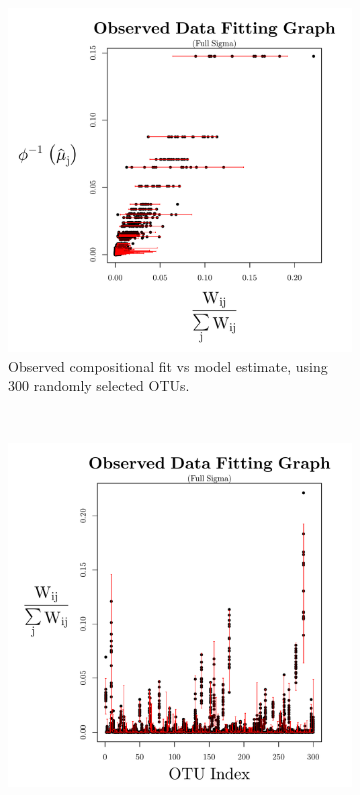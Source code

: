 \documentclass{template}
\begin{document}
\begin{figure}[ht!]
    \centering
    \begin{subfigure}[b]{0.38\textheight}
        \includegraphics[width=\textwidth]{Images/XiaPlotBars300.pdf}
        \caption{Observed compositional fit vs model estimate, using 300 randomly selected OTUs.}
    \end{subfigure}
\\
    \begin{subfigure}[b]{0.38\textheight}
        \includegraphics[width=\textwidth]{Images/XiaPlotBars300T.pdf}

\end{subfigure}
\end{figure}
\end{document}
